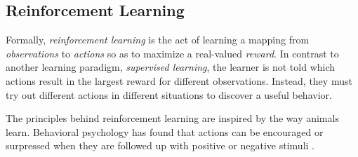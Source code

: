 \subsection{Reinforcement Learning}
Formally, \textit{reinforcement learning} is the act of learning a mapping from \textit{observations} to \textit{actions} so as to maximize a real-valued \textit{reward}. In contrast to another learning paradigm, \textit{supervised learning}, the learner is not told which actions result in the largest reward for different observations. Instead, they must try out different actions in different situations to discover a useful behavior. \cite{bible}

The principles behind reinforcement learning are inspired by the way animals learn. Behavioral psychology has found that actions can be encouraged or surpressed when they are followed up with positive or negative stimuli \cite{thorndike}.





